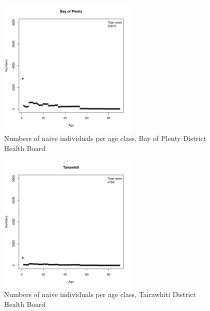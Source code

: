 \documentclass{article}
\begin{document}
\begin{figure}
     \begin{center}
     \includegraphics[width=0.6\textwidth]{dhb7.pdf}
     \end{center}
     \caption{Numbers of naive individuals per age class, Bay of Plenty District Health Board}
     \label{fig:BayofPlenty}
\end{figure}

\begin{figure}
     \begin{center}
     \includegraphics[width=0.6\textwidth]{dhb8.pdf}
     \end{center}
     \caption{Numbers of naive individuals per age class, Tairawhiti District Health Board}
     \label{fig:Tairawhiti}
\end{figure}
\end{document}
